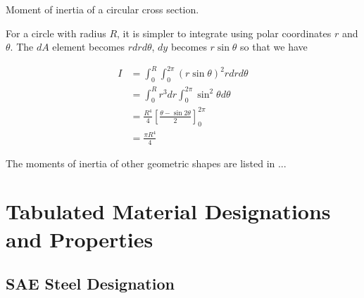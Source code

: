 \documentclass[
10pt,
a4paper,
openany,
svgnames,
]{book}
\begin{document}
\begin{example} Moment of inertia of a circular cross section.

  For a circle with radius $R$, it is simpler to integrate using polar coordinates $r$ and $\theta$. The $dA$ element becomes $rdrd\theta$, $dy$ becomes $r \sin \theta$ so that we have

  \begin{align*}
    I &= \int_0^R \int_0^{2\pi} \left( r \sin \theta \right)^2 r dr d\theta \\
      &= \int_0^R r^3 dr \int_0^{2\pi} \sin^2 \theta d\theta \\
      &= \frac{R^4}{4} \left[ \frac{\theta - \sin 2\theta}{2} \right]_0^{2\pi} \\
      &= \frac{\pi R^4}{4}
  \end{align*}

\end{example}

The moments of inertia of other geometric shapes are listed in ...

\begin{table}
\end{table}

\chapter{Tabulated Material Designations and Properties}

\section{SAE Steel Designation}
\end{document}

